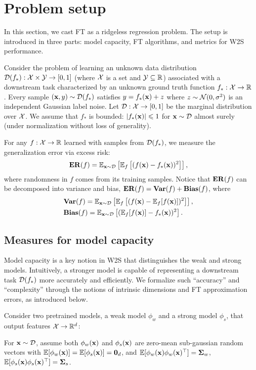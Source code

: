 \section{Problem setup}\label{sec:ridgeless_regression}
In this section, we cast FT as a ridgeless regression problem. The setup is introduced in three parts: model capacity, FT algorithms, and metrics for W2S performance.

Consider the problem of learning an unknown data distribution $\mathcal{D}(f_*): \mathcal{X} \times \mathcal{Y} \to [0,1]$ (where $\mathcal{X}$ is a set and $\mathcal{Y} \subseteq \mathbb{R}$) associated with a downstream task characterized by an unknown ground truth function $f_*: \mathcal{X} \to \mathbb{R}$. Every sample $(\mathbf{x}, y) \sim \mathcal{D}(f_*)$ satisfies $y = f_*(\mathbf{x}) + z$ where $z \sim \mathcal{N}(0, \sigma^2)$ is an independent Gaussian label noise. Let $\mathcal{D}: \mathcal{X} \to [0,1]$ be the marginal distribution over $\mathcal{X}$. We assume that $f_*$ is bounded: $\left\vert f_*(\mathbf{x})\right\vert \leqslant 1$ for $\mathbf{x} \sim \mathcal{D}$ almost surely (under normalization without loss of generality).

For any $f: \mathcal{X} \to \mathbb{R}$ learned with samples from $\mathcal{D}(f_*)$, we measure the generalization error via excess risk:
\begin{align}
    \mathbf{ER}(f) = \mathbb{E}_{\mathbf{x} \sim \mathcal{D}}\left[\mathbb{E}_{f}\left[(f(\mathbf{x}) - f_*(\mathbf{x}))^2\right]\right],
\end{align}
where randomness in $f$ comes from its training samples.
Notice that $\mathbf{ER}(f)$ can be decomposed into variance and bias, $\mathbf{ER}(f) = \mathbf{Var}(f) + \mathbf{Bias}(f)$,
where
\begin{align*}
    &\mathbf{Var}(f) = \mathbb{E}_{\mathbf{x} \sim \mathcal{D}}\left[\mathbb{E}_{f}\left[(f(\mathbf{x}) - \mathbb{E}_{f}[f(\mathbf{x})])^2\right]\right], \\
    &\mathbf{Bias}(f) = \mathbb{E}_{\mathbf{x} \sim \mathcal{D}}\left[(\mathbb{E}_{f}[f(\mathbf{x})] - f_*(\mathbf{x}))^2\right].
\end{align*}




\subsection{Measures for model capacity}
Model capacity is a key notion in W2S that distinguishes the weak and strong models. Intuitively, a stronger model is capable of representing a downstream task $\mathcal{D}(f_*)$ more accurately and efficiently. We formalize such ``accuracy'' and ``complexity'' through the notions of intrinsic dimensions and FT approximation errors, as introduced below.

Consider two pretrained models, a weak model $\phi_w$ and a strong model $\phi_s$, that output features $\mathcal{X} \to \mathbb{R}^d$:
\begin{assumption}\label{asm:features}
    For $\mathbf{x}\sim \mathcal{D}$, assume both $\phi_w(\mathbf{x})$ and $\phi_s(\mathbf{x})$ are zero-mean sub-gaussian random vectors with $\mathbb{E}[\phi_w(\mathbf{x})] = \mathbb{E}[\phi_s(\mathbf{x})] = \textbf{0}_d$, and $\mathbb{E}[\phi_w(\mathbf{x}) \phi_w(\mathbf{x})^\top] = \boldsymbol{\Sigma}_w$, $\mathbb{E}[\phi_s(\mathbf{x}) \phi_s(\mathbf{x})^\top] = \boldsymbol{\Sigma}_s$.
\end{assumption}

